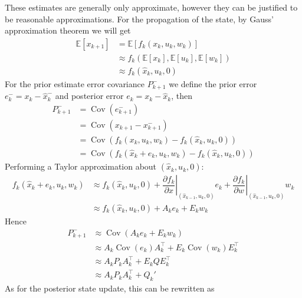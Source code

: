 \documentclass[11pt]{report} %
\begin{document}
These estimates are generally only approximate, however they can be justified to be reasonable approximations. For the propagation of the state, by Gauss' approximation theorem we will get
\begin{align}
\mathbb{E}\left[x_{k + 1}\right] &= \mathbb{E}\left[f_{k}\left(x_{k}, u_{k}, w_{k}\right)\right] \\
&\approx f_{k}\left(\mathbb{E}\left[x_{k}\right], \mathbb{E}\left[u_{k}\right], \mathbb{E}\left[w_{k}\right]\right) \\
&\approx f_{k}\left(\hat{x}_{k}, u_{k}, 0\right)
\end{align}
For the prior estimate error covariance $P_{k + 1}^{-}$ we define the prior error $e_{k}^{-} = x_{k} - \hat{x}_{k}^{-}$ and posterior error $e_{k} = x_{k} - \hat{x}_{k}$, then
\begin{align}
P_{k + 1}^{-} &= \operatorname{Cov}\left(e_{k + 1}^{-}\right) \\
&= \operatorname{Cov}\left(x_{k + 1} - x_{k + 1}^{-}\right) \\
&= \operatorname{Cov}\left(f_{k}\left(x_{k}, u_{k}, w_{k}\right) - f_{k}\left(\hat{x}_{k}, u_{k}, 0\right)\right) \\
&= \operatorname{Cov}\left(f_{k}\left(\hat{x}_{k} + e_{k}, u_{k}, w_{k}\right) - f_{k}\left(\hat{x}_{k}, u_{k}, 0\right)\right)
\end{align}
Performing a Taylor approximation about $\left(\hat{x}_{k}, u_{k}, 0\right)$:
\begin{align}
f_{k}\left(\hat{x}_{k} + e_{k}, u_{k}, w_{k}\right) &\approx f_{k}\left(\hat{x}_{k}, u_{k}, 0\right) + \left.\dfrac{\partial f_{k}}{\partial x}\right|_{\left(\hat{x}_{k - 1}, u_{k}, 0\right)}e_{k} + \left.\dfrac{\partial f_{k}}{\partial w}\right|_{\left(\hat{x}_{k - 1}, u_{k}, 0\right)}w_{k} \\
&\approx f_{k}\left(\hat{x}_{k}, u_{k}, 0\right) + A_{k}e_{k} + E_{k}w_{k}
\end{align}
Hence
\begin{align}
P_{k + 1}^{-} &\approx \operatorname{Cov}\left(A_{k}e_{k} + E_{k}w_{k}\right) \\
&\approx A_{k}\operatorname{Cov}\left(e_{k}\right)A_{k}^{\top} + E_{k}\operatorname{Cov}\left(w_{k}\right)E_{k}^{\top} \\
&\approx A_{k}P_{k}A_{k}^{\top} + E_{k}QE_{k}^{\top} \\
&\approx A_{k}P_{k}A_{k}^{\top} + Q_{k}'
\end{align}
As for the posterior state update, this can be rewritten as
\end{document}

